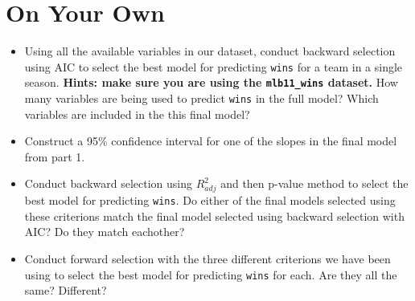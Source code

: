 \documentclass[]{book}
\theoremstyle{definition}
\theoremstyle{definition}
\theoremstyle{definition}
\theoremstyle{remark}
\begin{document}
\section{On Your Own}\label{on-your-own-8}

\begin{itemize}
\item
  Using all the available variables in our dataset, conduct backward
  selection using AIC to select the best model for predicting
  \texttt{wins} for a team in a single season. \textbf{Hints: make sure
  you are using the \texttt{mlb11\_wins} dataset.} How many variables
  are being used to predict \texttt{wins} in the full model? Which
  variables are included in the this final model?
\item
  Construct a 95\% confidence interval for one of the slopes in the
  final model from part 1.
\item
  Conduct backward selection using \(R^2_{adj}\) and then p-value method
  to select the best model for predicting \texttt{wins}. Do either of
  the final models selected using these criterions match the final model
  selected using backward selection with AIC? Do they match eachother?
\item
  Conduct forward selection with the three different criterions we have
  been using to select the best model for predicting \texttt{wins} for
  each. Are they all the same? Different?
\end{itemize}


\end{document}
